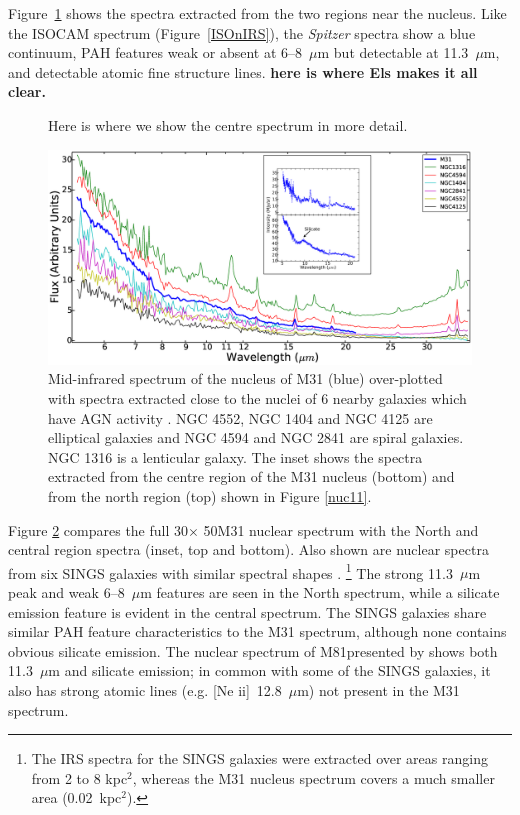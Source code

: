 Figure~\ref{fig:nuc_detail} shows the spectra extracted from the two regions near the nucleus.
Like the ISOCAM spectrum (Figure~\ref{ISOnIRS}), the  {\em Spitzer} spectra show a blue
continuum, PAH features weak or absent at 6--8~$\mu$m  but detectable at 11.3~$\mu$m, and detectable atomic fine structure lines.
{\bf here is where Els makes it all clear.}

\begin{figure}
\centering
\caption{Here is where we show the centre spectrum in more detail.}
\label{fig:nuc_detail}
\end{figure}


\begin{figure}
\centering
\includegraphics[height = 8 cm]{./SINGSspec.eps}
\caption{Mid-infrared spectrum of the nucleus of M31 (blue) over-plotted with spectra extracted close to the nuclei of 6 nearby galaxies which have 
AGN activity \citep{Smith:2007lr}. NGC 4552, NGC 1404 and NGC 4125 are elliptical galaxies and NGC 4594 and NGC 2841 are spiral galaxies. 
NGC 1316 is a lenticular galaxy. The inset shows the spectra extracted from the centre region of the M31 nucleus (bottom) and from the north region (top) 
shown in Figure \ref{nuc11}.}
\label{smithspec}
\end{figure}

Figure \ref{smithspec} compares the full 30\arcsec $\times$ 50\arcsec M31 nuclear spectrum with
the North and central region spectra (inset, top and bottom). Also shown are nuclear spectra
from six SINGS galaxies with similar spectral shapes \citep{Smith:2007lr}.%
\footnote{The IRS spectra for the SINGS galaxies were extracted over areas ranging from 2 to 8 kpc$^2$, whereas the M31
nucleus spectrum covers a much smaller area (0.02~kpc$^2$).}
The strong 11.3~$\mu$m peak  and weak 6--8~$\mu$m features are  seen  in the
North spectrum, while a silicate emission feature is evident in the central spectrum.
The SINGS galaxies share similar PAH feature characteristics to the M31 spectrum, although none
contains obvious silicate emission. The nuclear spectrum of M81presented by \citet{Smith2010}
shows both 11.3~$\mu$m  and silicate emission; in common with some of the SINGS galaxies,
it also has strong atomic lines (e.g. [Ne {\sc ii}]~12.8~$\mu$m) not present in the M31 spectrum.


